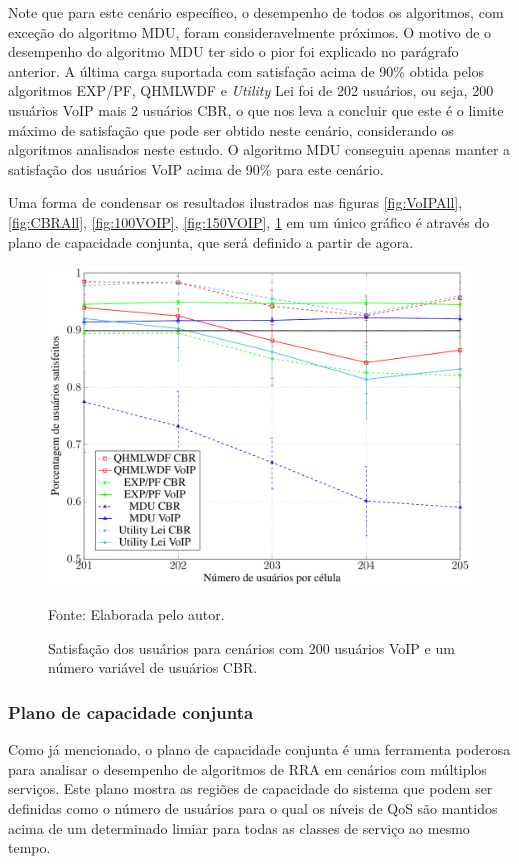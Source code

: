Note que para este cenário específico, o desempenho de todos os algoritmos, com exceção do algoritmo MDU, foram consideravelmente próximos. O motivo de o desempenho do algoritmo MDU ter sido o pior foi explicado no parágrafo anterior. A última carga suportada com satisfação acima de 90\% obtida pelos algoritmos EXP/PF, QHMLWDF e \textit{Utility} Lei foi de 202 usuários, ou seja, 200 usuários VoIP mais 2 usuários CBR, o que nos leva a concluir que este é o limite máximo de satisfação que pode ser obtido neste cenário, considerando os algoritmos analisados neste estudo. O algoritmo MDU conseguiu apenas manter a satisfação dos usuários VoIP acima de 90\% para este cenário.

Uma forma de condensar os resultados ilustrados nas figuras \ref{fig:VoIPAll}, \ref{fig:CBRAll}, \ref{fig:100VOIP}, \ref{fig:150VOIP}, \ref{fig:200VOIP} em um único gráfico é através do plano de capacidade conjunta, que será definido a partir de agora.

\begin{figure}
	\centering
	
	\caption[Satisfação dos usuários para cenários com 200 usuários VoIP e um número variável de usuários CBR]{Satisfação dos usuários para cenários com 200 usuários VoIP e um número variável de usuários CBR.}
	\includegraphics[width=.8\linewidth]{figs/200VOIP.pdf}
	
	{Fonte: Elaborada pelo autor.}
	\label{fig:200VOIP}
\end{figure}

\subsubsection{Plano de capacidade conjunta}

Como já mencionado, o plano de capacidade conjunta é uma ferramenta poderosa para analisar o desempenho de algoritmos de RRA em cenários com múltiplos serviços. Este plano mostra as regiões de capacidade do sistema que podem ser definidas como o número de usuários para o qual os níveis de QoS são mantidos acima de um determinado limiar para todas as classes de serviço ao mesmo tempo.

